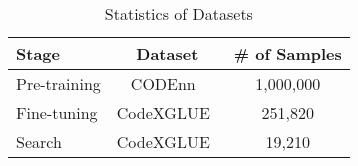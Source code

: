 \begin{table}[!t]
\caption{\rmfamily Statistics of Datasets}
\rmfamily
\centering
\label{tab:dataset}
\begin{threeparttable}
\begin{tabular}{lcc}
\toprule
\textbf{Stage} & \textbf{Dataset} & \textbf{\# of Samples}   \\ \bottomrule
Pre-training                 & CODEnn~\cite{deepcs} & 1,000,000  \\
Fine-tuning                 & CodeXGLUE~\cite{CodeXGlue} &  251,820 \\
Search    &   CodeXGLUE~\cite{CodeXGlue} & 19,210  \\ \bottomrule
\end{tabular}
\end{threeparttable}
\vspace{-3mm}
\end{table}